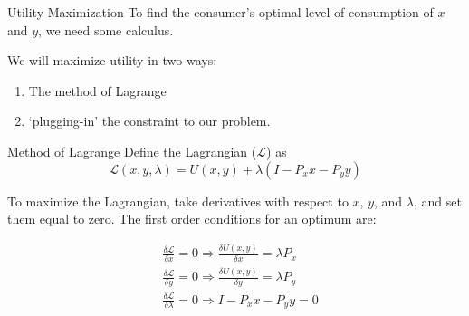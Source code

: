 \documentclass[12pt,t]{beamer}
\begin{document}

\begin{frame}{Utility Maximization}
  To find the consumer's optimal level of consumption of $x$  and $y$, we need some calculus.

  \bigskip
  We will maximize utility in two-ways:
  \begin{enumerate}
    \item The method of Lagrange

    \item `plugging-in' the constraint to our problem.
  \end{enumerate} 
\end{frame}

\begin{frame}{Method of Lagrange}
  Define the Lagrangian ($\mathcal{L}$) as 
  $$
    \mathcal{L}(x,y,\lambda) = U(x,y) + \lambda(I-P_x x - P_y y)
  $$


  \pause
  To maximize the Lagrangian, take derivatives with respect to $x$, $y$, and $\lambda$, and set them equal to zero. The first order conditions for an optimum are:

  \vspace*{-10mm}
  \begin{align*}
    &\frac{\delta \mathcal{L}}{\delta x}=0 \Rightarrow \frac{\delta U(x,y)}{\delta x} = \lambda P_x \\
    &\frac{\delta \mathcal{L}}{\delta y}=0 \Rightarrow \frac{\delta U(x,y)}{\delta y} = \lambda P_y \\
    &\frac{\delta \mathcal{L}}{\delta \lambda}=0 \Rightarrow I - P_x x - P_y y = 0
  \end{align*}
\end{frame}
\end{document}
